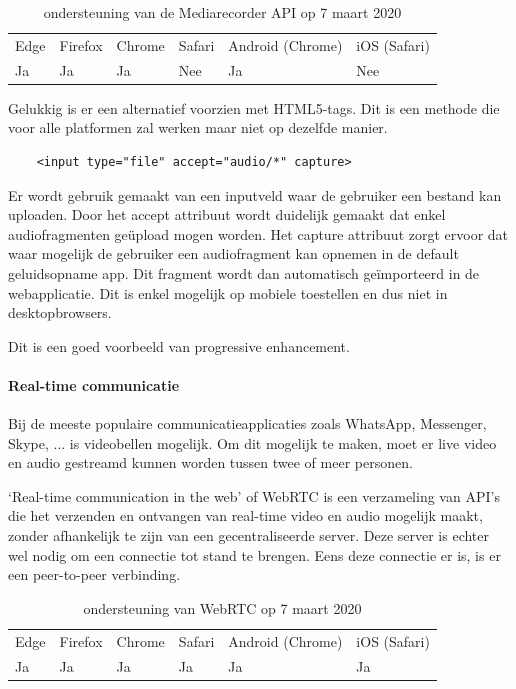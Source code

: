	
	
	\begin{table}[H]
		\centering
		\begin{tabular}{llllll}
			Edge & Firefox & Chrome & Safari & Android (Chrome) & iOS (Safari) \\
			Ja   & Ja      & Ja     & Nee     & Ja               & Nee          
		\end{tabular}	
		\caption{ondersteuning van de Mediarecorder API op 7 maart 2020}
	\end{table}
	
	Gelukkig is er een alternatief voorzien met HTML5-tags. Dit is een methode die voor alle platformen zal werken maar niet op dezelfde manier.
	
	\begin{lstlisting}
	<input type="file" accept="audio/*" capture>
	\end{lstlisting}
	
	Er wordt gebruik gemaakt van een inputveld waar de gebruiker een bestand kan uploaden. Door het accept attribuut wordt duidelijk gemaakt dat enkel audiofragmenten geüpload mogen worden. Het capture attribuut zorgt ervoor dat waar mogelijk de gebruiker een audiofragment kan opnemen in de default geluidsopname app. Dit fragment wordt dan automatisch geïmporteerd in de webapplicatie. Dit is enkel mogelijk op mobiele toestellen en dus niet in desktopbrowsers.
	\autocite{Kinlan2019}
	
	Dit is een goed voorbeeld van progressive enhancement. 
	
	
	
	\paragraph{Real-time communicatie }
	
	Bij de meeste populaire communicatieapplicaties zoals WhatsApp, Messenger, Skype, ... is videobellen mogelijk. Om dit mogelijk te maken, moet er live video en audio gestreamd kunnen worden tussen twee of meer personen.
	
	‘Real-time communication in the web’ of WebRTC \autocite{Jennings2019} is een verzameling van API's die het verzenden en ontvangen van real-time video en audio mogelijk maakt, zonder afhankelijk te zijn van een gecentraliseerde server. Deze server is echter wel nodig om een connectie tot stand te brengen. Eens deze connectie er is, is er een peer-to-peer verbinding.
	
	\begin{table}[H]
		\centering
		\begin{tabular}{llllll}
			Edge & Firefox & Chrome & Safari & Android (Chrome) & iOS (Safari) \\
			Ja   & Ja      & Ja     & Ja     & Ja               & Ja          
		\end{tabular}	
		\caption{ondersteuning van WebRTC op 7 maart 2020}
	\end{table}
	

